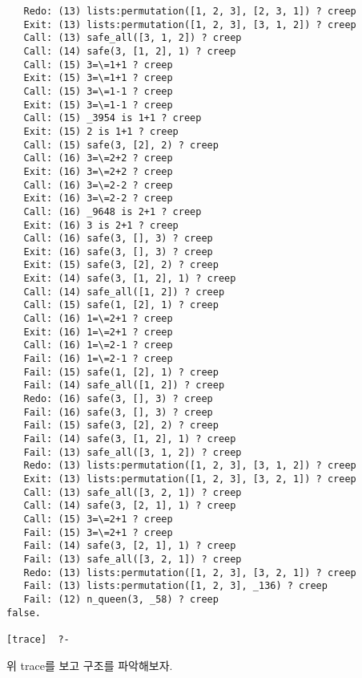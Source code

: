 \documentclass{article}
\begin{document}
\begin{lstlisting}
   Redo: (13) lists:permutation([1, 2, 3], [2, 3, 1]) ? creep
   Exit: (13) lists:permutation([1, 2, 3], [3, 1, 2]) ? creep
   Call: (13) safe_all([3, 1, 2]) ? creep
   Call: (14) safe(3, [1, 2], 1) ? creep
   Call: (15) 3=\=1+1 ? creep
   Exit: (15) 3=\=1+1 ? creep
   Call: (15) 3=\=1-1 ? creep
   Exit: (15) 3=\=1-1 ? creep
   Call: (15) _3954 is 1+1 ? creep
   Exit: (15) 2 is 1+1 ? creep
   Call: (15) safe(3, [2], 2) ? creep
   Call: (16) 3=\=2+2 ? creep
   Exit: (16) 3=\=2+2 ? creep
   Call: (16) 3=\=2-2 ? creep
   Exit: (16) 3=\=2-2 ? creep
   Call: (16) _9648 is 2+1 ? creep
   Exit: (16) 3 is 2+1 ? creep
   Call: (16) safe(3, [], 3) ? creep
   Exit: (16) safe(3, [], 3) ? creep
   Exit: (15) safe(3, [2], 2) ? creep
   Exit: (14) safe(3, [1, 2], 1) ? creep
   Call: (14) safe_all([1, 2]) ? creep
   Call: (15) safe(1, [2], 1) ? creep
   Call: (16) 1=\=2+1 ? creep
   Exit: (16) 1=\=2+1 ? creep
   Call: (16) 1=\=2-1 ? creep
   Fail: (16) 1=\=2-1 ? creep
   Fail: (15) safe(1, [2], 1) ? creep
   Fail: (14) safe_all([1, 2]) ? creep
   Redo: (16) safe(3, [], 3) ? creep
   Fail: (16) safe(3, [], 3) ? creep
   Fail: (15) safe(3, [2], 2) ? creep
   Fail: (14) safe(3, [1, 2], 1) ? creep
   Fail: (13) safe_all([3, 1, 2]) ? creep
   Redo: (13) lists:permutation([1, 2, 3], [3, 1, 2]) ? creep
   Exit: (13) lists:permutation([1, 2, 3], [3, 2, 1]) ? creep
   Call: (13) safe_all([3, 2, 1]) ? creep
   Call: (14) safe(3, [2, 1], 1) ? creep
   Call: (15) 3=\=2+1 ? creep
   Fail: (15) 3=\=2+1 ? creep
   Fail: (14) safe(3, [2, 1], 1) ? creep
   Fail: (13) safe_all([3, 2, 1]) ? creep
   Redo: (13) lists:permutation([1, 2, 3], [3, 2, 1]) ? creep
   Fail: (13) lists:permutation([1, 2, 3], _136) ? creep
   Fail: (12) n_queen(3, _58) ? creep
false.

[trace]  ?-

\end{lstlisting}

위 trace를 보고 구조를 파악해보자.  

\\ \\
\end{document}

